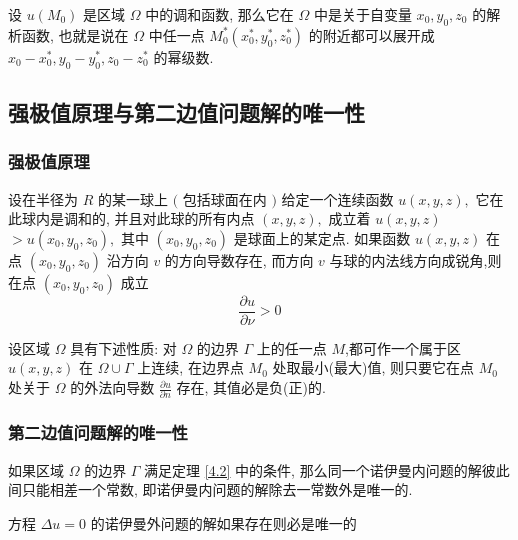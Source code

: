 \documentclass[10pt]{yerbaformat}
\begin{document}
\begin{theorem}[调和函数的解析性定理]
    设 $u\left(M_{0}\right)$ 是区域 $\Omega$ 中的调和函数, 那么它在 $\Omega$ 中是关于自变量 $x_{0}, y_{0}, z_{0}$ 的解析函数, 也就是说在 $\Omega$ 中任一点 $M_{0}^{*}\left(x_{0}^{*}, y_{0}^{*}, z_{0}^{*}\right)$ 的附近都可以展开成 $x_{0}-x_{0}^{*}, y_{0}-y_{0}^{*}, z_{0}-z_{0}^{*}$ 的幂级数.
\end{theorem}

\subsection{强极值原理与第二边值问题解的唯一性}
\subsubsection{强极值原理}

\begin{theorem}[强极值原理]
    设在半径为 $R$ 的某一球上 $($ 包括球面在内 $)$ 给定一个连续函数 $u(x, y, z),$ 它在此球内是调和的, 并且对此球的所有内点 $(x, y, z),$ 成立着 $u(x, y, z)$ $>u\left(x_{0}, y_{0}, z_{0}\right),$ 其中 $\left(x_{0}, y_{0}, z_{0}\right)$ 是球面上的某定点. 如果函数 $u(x, y, z)$ 在点 $(x_{0}, y_{0}, z_{0})$ 沿方向 $v$ 的方向导数存在, 而方向 $v$ 与球的内法线方向成锐角,则在点 $\left(x_{0}, y_{0}, z_{0}\right)$ 成立
    $$
    \frac{\partial u}{\partial \nu}>0
    $$
\end{theorem}

\begin{theorem}\label{4.2}
    设区域 $\Omega$ 具有下述性质: 对 $\Omega$ 的边界 $\Gamma$ 上的任一点 $M$,都可作一个属于区 $u(x, y, z)$ 在 $\Omega \cup \Gamma$ 上连续, 在边界点 $M_{0}$ 处取最小(最大)值, 则只要它在点 $M_{0}$ 处关于 $\Omega$ 的外法向导数 $\frac{\partial u}{\partial n}$ 存在, 其值必是负(正)的.
\end{theorem}

\subsubsection{第二边值问题解的唯一性}

\begin{theorem}
    如果区域 $\Omega$ 的边界 $\Gamma$ 满足定理 \ref{4.2} 中的条件, 那么同一个诺伊曼内问题的解彼此间只能相差一个常数, 即诺伊曼内问题的解除去一常数外是唯一的.
\end{theorem}

\begin{theorem}
    方程 $\Delta u =0$ 的诺伊曼外问题的解如果存在则必是唯一的
\end{theorem}

\end{document}
